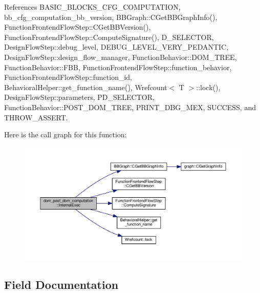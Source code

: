 References B\+A\+S\+I\+C\+\_\+\+B\+L\+O\+C\+K\+S\+\_\+\+C\+F\+G\+\_\+\+C\+O\+M\+P\+U\+T\+A\+T\+I\+ON, bb\+\_\+cfg\+\_\+computation\+\_\+bb\+\_\+version, B\+B\+Graph\+::\+C\+Get\+B\+B\+Graph\+Info(), Function\+Frontend\+Flow\+Step\+::\+C\+Get\+B\+B\+Version(), Function\+Frontend\+Flow\+Step\+::\+Compute\+Signature(), D\+\_\+\+S\+E\+L\+E\+C\+T\+OR, Design\+Flow\+Step\+::debug\+\_\+level, D\+E\+B\+U\+G\+\_\+\+L\+E\+V\+E\+L\+\_\+\+V\+E\+R\+Y\+\_\+\+P\+E\+D\+A\+N\+T\+IC, Design\+Flow\+Step\+::design\+\_\+flow\+\_\+manager, Function\+Behavior\+::\+D\+O\+M\+\_\+\+T\+R\+EE, Function\+Behavior\+::\+F\+BB, Function\+Frontend\+Flow\+Step\+::function\+\_\+behavior, Function\+Frontend\+Flow\+Step\+::function\+\_\+id, Behavioral\+Helper\+::get\+\_\+function\+\_\+name(), Wrefcount$<$ T $>$\+::lock(), Design\+Flow\+Step\+::parameters, P\+D\+\_\+\+S\+E\+L\+E\+C\+T\+OR, Function\+Behavior\+::\+P\+O\+S\+T\+\_\+\+D\+O\+M\+\_\+\+T\+R\+EE, P\+R\+I\+N\+T\+\_\+\+D\+B\+G\+\_\+\+M\+EX, S\+U\+C\+C\+E\+SS, and T\+H\+R\+O\+W\+\_\+\+A\+S\+S\+E\+RT.

Here is the call graph for this function\+:
\nopagebreak
\begin{figure}[H]
\begin{center}
\leavevmode
\includegraphics[width=350pt]{db/d28/classdom__post__dom__computation_abbbb4f87f023daa6c79cf21ff1238044_cgraph}
\end{center}
\end{figure}


\subsection{Field Documentation}
\mbox{\label{classdom__post__dom__computation_a34442652072b9cb733dcdf6e63d17d6d}} 
